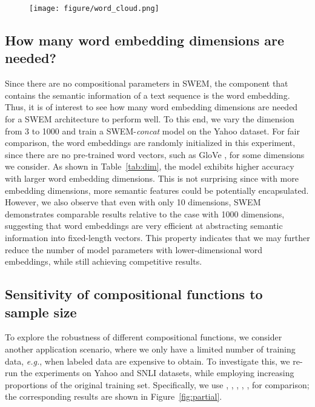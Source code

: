 \documentclass[11pt,a4paper]{article}
\begin{document}
\begin{figure}[!h]
	\vspace{-1mm}
	\centering
	\texttt{[image: figure/word\_cloud.png]}
	\vspace{0mm}
	\label{fig:key}
	\vspace{-1mm}
\end{figure}

\subsection{How many word embedding dimensions are needed?} \label{need}
Since there are no compositional parameters in SWEM, the component that contains the semantic information of a text sequence is the word embedding.
Thus, it is of interest to see how many word embedding dimensions are needed for a SWEM architecture to perform well.
To this end, we vary the dimension from 3 to 1000 and train a SWEM-\emph{concat} model on the Yahoo dataset.
For fair comparison, the word embeddings are randomly initialized in this experiment, since there are no pre-trained word vectors, such as GloVe \citep{pennington2014glove}, for some dimensions we consider.
As shown in Table~\ref{tab:dim}, the model exhibits higher accuracy with larger word embedding dimensions. 
This is not surprising since with more embedding dimensions, more semantic features could be potentially encapsulated.
However, we also observe that even with only 10 dimensions, SWEM demonstrates comparable results relative to the case with 1000 dimensions, suggesting that word embeddings are very efficient at abstracting semantic information into fixed-length vectors.
This property indicates that we may further reduce the number of model parameters with lower-dimensional word embeddings, while still achieving competitive results.

\subsection{Sensitivity of compositional functions to sample size} \label{semi}
To explore the robustness of different compositional functions, we consider another application scenario, where we only have a limited number of training data, \emph{e.g.}, when labeled data are expensive to obtain.
To investigate this, we re-run the experiments on Yahoo and SNLI datasets, while employing increasing proportions of the original training set.
Specifically, we use , ,  , , ,  for comparison; the corresponding results are shown in Figure~\ref{fig:partial}.
\end{document}
